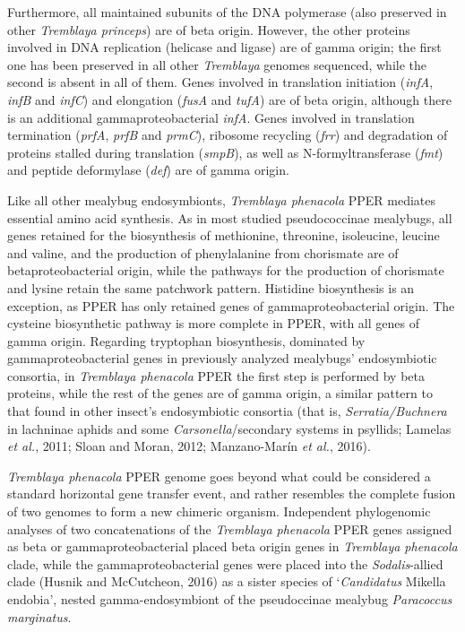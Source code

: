 \documentclass[11pt]{article}
\begin{document}
\begin{sloppypar}
Furthermore, all maintained subunits of the DNA polymerase (also preserved in other \textit{Tremblaya princeps}) are of beta origin. 
However, the other proteins involved in DNA replication (helicase and ligase) are of gamma origin; the first one has been preserved in all other \textit{Tremblaya} genomes sequenced, while the second is absent in all of them. 
Genes involved in translation initiation (\textit{infA}, \textit{infB} and \textit{infC}) and elongation (\textit{fusA} and \textit{tufA}) are of beta origin, although there is an additional gammaproteobacterial \textit{infA}. 
Genes involved in translation termination (\textit{prfA}, \textit{prfB} and \textit{prmC}), ribosome recycling (\textit{frr}) and degradation of proteins stalled during translation (\textit{smpB}), as well as N-formyltransferase (\textit{fmt}) and peptide deformylase (\textit{def}) are of gamma origin.
\par
Like all other mealybug endosymbionts, \textit{Tremblaya phenacola} PPER mediates essential amino acid synthesis. 
As in most studied pseudococcinae mealybugs, all genes retained for the biosynthesis of methionine, threonine, isoleucine, leucine and valine, and the production of phenylalanine from chorismate are of betaproteobacterial origin, while the pathways for the production of chorismate and lysine retain the same patchwork pattern. 
Histidine biosynthesis is an exception, as PPER has only retained genes of gammaproteobacterial origin. 
The cysteine biosynthetic pathway is more complete in PPER, with all genes of gamma origin. 
Regarding tryptophan biosynthesis, dominated by gammaproteobacterial genes in previously analyzed mealybugs’ endosymbiotic consortia, in \textit{Tremblaya phenacola} PPER the first step is performed by beta proteins, while the rest of the genes are of gamma origin, a similar pattern to that found in other insect’s endosymbiotic consortia (that is, \textit{Serratia/Buchnera} in lachninae aphids and some \textit{Carsonella}/secondary systems in psyllids; Lamelas \textit{et al.}, 2011; Sloan and Moran, 2012; Manzano-Marín \textit{et al.}, 2016). 
\par
\textit{Tremblaya phenacola} PPER genome goes beyond what could be considered a standard horizontal gene transfer event, and rather resembles the complete fusion of two genomes to form a new chimeric organism. 
Independent phylogenomic analyses of two concatenations of the \textit{Tremblaya phenacola} PPER genes assigned as beta or gammaproteobacterial placed beta origin genes in \textit{Tremblaya phenacola} clade, while the gammaproteobacterial genes were placed into the \textit{Sodalis}-allied clade (Husnik and McCutcheon, 2016) as a sister species of ‘\textit{Candidatus} Mikella endobia’, nested gamma-endosymbiont of the pseudoccinae mealybug \textit{Paracoccus marginatus}. 

\end{sloppypar}
\end{document}

